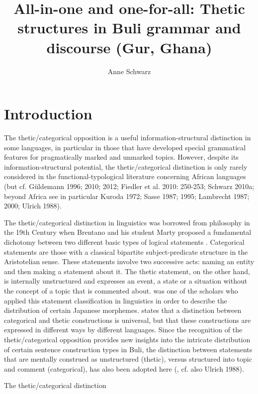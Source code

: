 \documentclass[output=paper]{langsci/langscibook}
\title{All-in-one and one-for-all: Thetic structures in Buli grammar and discourse (Gur, Ghana)}
\author{%
 Anne Schwarz \affiliation{Universidad Regional Amazónica IKIAM}
}
\begin{document}
 

\section{ Introduction}

The thetic/categorical opposition is a useful information-structural distinction in some languages, in particular in those that have developed special grammatical features for pragmatically marked and unmarked topics. However, despite its information-structural potential, the thetic/categorical distinction is only rarely considered in the functional-typological literature concerning African languages (but cf. Güldemann 1996; 2010; 2012; Fiedler et al. 2010: 250-253; Schwarz 2010a; beyond Africa see in particular Kuroda 1972; Sasse 1987; 1995; Lambrecht 1987; 2000; Ulrich 1988). 

The thetic/categorical distinction in linguistics was borrowed from philosophy in the 19th Century when Brentano and his student Marty proposed a fundamental dichotomy between two different basic types of logical statements \citep[535]{Sasse1987}. Categorical statements are those with a classical bipartite subject-predicate structure in the Aristotelian sense. These statements involve two successive acts: naming an entity and then making a statement about it. The thetic statement, on the other hand, is internally unstructured and expresses an event, a state or a situation without the concept of a topic that is commented about. \citet{Kuroda1972} was one of the scholars who applied this statement classification in linguistics in order to describe the distribution of certain Japanese morphemes\textit{. }\citet[388]{Ulrich1988} states that a distinction between categorical and thetic constructions is universal, but that these constructions are expressed in different ways by different languages. Since the recognition of the thetic/categorical opposition provides new insights into the intricate distribution of certain sentence construction types in Buli, the distinction between statements that are mentally construed as unstructured (thetic), versus structured into topic and comment (categorical), has also been adopted here (, cf. also Ulrich 1988). 

\begin{stylelsTableHeading}%
\begin{table}
\caption{The thetic/categorical distinction}
\label{tab:1}
\end{table}\end{stylelsTableHeading}
\end{document}
